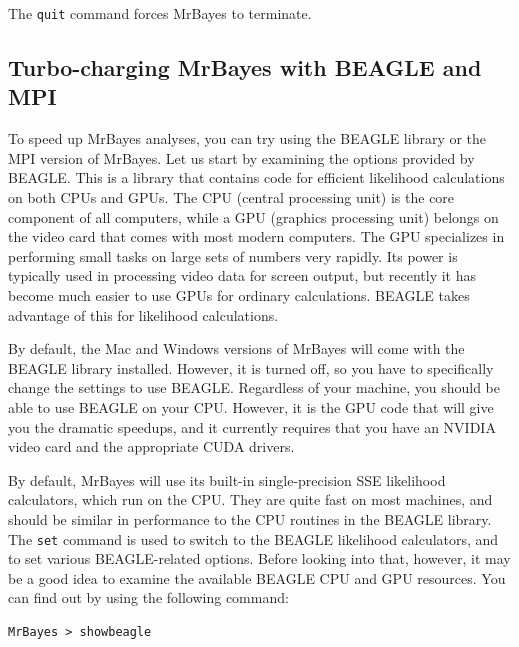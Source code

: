 \documentclass[12pt]{book}
\begin{document}
The \texttt{quit} command forces MrBayes to terminate.


\subsection{Turbo-charging MrBayes with BEAGLE and MPI}

To speed up MrBayes analyses, you can try using the BEAGLE library or the MPI version of MrBayes.
Let us start by examining the options provided by BEAGLE. This is a library that contains code for
efficient likelihood calculations on both CPUs and GPUs. The CPU (central processing unit) is the
core component of all computers, while a GPU (graphics processing unit) belongs on the video card
that comes with most modern computers. The GPU specializes in performing small tasks on large sets
of numbers very rapidly. Its power is typically used in processing video data for screen output,
but recently it has become much easier to use GPUs for ordinary calculations. BEAGLE takes
advantage of this for likelihood calculations.

By default, the Mac and Windows versions of MrBayes will come with the BEAGLE library installed.
However, it is turned off, so you have to specifically change the settings to use BEAGLE.
Regardless of your machine, you should be able to use BEAGLE on your CPU. However, it is the GPU
code that will give you the dramatic speedups, and it currently requires that you have an NVIDIA
video card and the appropriate CUDA drivers.

By default, MrBayes will use its built-in single-precision SSE likelihood calculators, which run on
the CPU. They are quite fast on most machines, and should be similar in performance to the CPU
routines in the BEAGLE library. The \texttt{set} command is used to switch to the BEAGLE likelihood
calculators, and to set various BEAGLE-related options. Before looking into that, however, it may
be a good idea to examine the available BEAGLE CPU and GPU resources. You can find out by using the
following command:

\begin{Verbatim}
MrBayes > showbeagle
\end{Verbatim}
\end{document}
